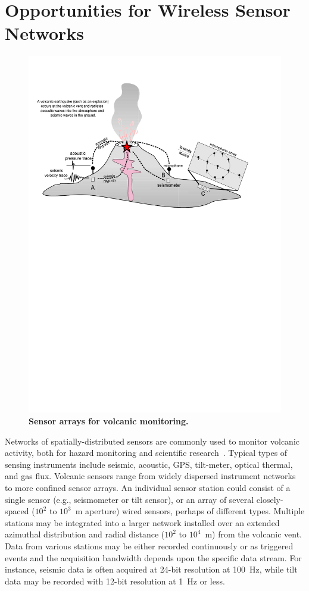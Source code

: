 \section{Opportunities for Wireless Sensor Networks}

\begin{figure}[t] 
\begin{center} 
\includegraphics[width=0.9\hsize,clip=true,bb=20 470 540 770]{./2-casestudy/figs/Cartoon2.pdf}
\end{center} 
\caption{\textbf{Sensor arrays for volcanic monitoring.}}
\label{introduction-fig-cartoon} 
\end{figure}

Networks of spatially-distributed sensors are commonly used to monitor
volcanic activity, both for hazard monitoring and scientific
research~\cite{Scarpa96}.  Typical types of sensing instruments include
seismic, acoustic, GPS, tilt-meter, optical thermal, and gas flux.  Volcanic
sensors range from widely dispersed instrument networks to more confined
sensor arrays. An individual sensor station could consist of a single sensor
(e.g., seismometer or tilt sensor), or an array of several closely-spaced
($10^2$ to $10^3$~m aperture) wired sensors, perhaps of different types.
Multiple stations may be integrated into a larger network installed over an
extended azimuthal distribution and radial distance ($10^2$ to $10^4$~m) from
the volcanic vent.  Data from various stations may be either recorded
continuously or as triggered events and the acquisition bandwidth depends
upon the specific data stream. For instance, seismic data is often acquired
at 24-bit resolution at 100~Hz, while tilt data may be recorded with 12-bit
resolution at 1~Hz or less.

